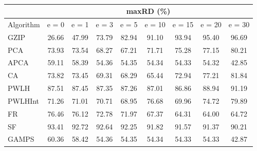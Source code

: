 \begin{table}[h]
\newcommand{\cpca}{\cellcolor{cyan!20}}
\newcommand{\capca}{\cellcolor{green!20}}
\newcommand{\cfr}{\cellcolor{yellow!25}}
\newcommand{\cgzip}{\cellcolor{orange!20}}
\newcommand{\best}{\cellcolor{gray!30}}
\centering\hspace*{0cm}\begin{tabular}{| l | c | c | c | c | c | c | c | c |}\cline{2-9}\multicolumn{1}{c|}{}& \multicolumn{8}{c|}{maxRD (\%)}\\\hline
{Algorithm} & {e = 0} & {e = 1} & {e = 3} & {e = 5} & {e = 10} & {e = 15} & {e = 20} & {e = 30} \\\hline
{GZIP\cgzip} & {\best26.66} & {\best47.99} & {73.79} & {82.94} & {91.10} & {93.94} & {95.40} & {96.69} \\\hline
{PCA\cpca} & {73.93} & {73.54} & {68.27} & {67.21} & {71.71} & {75.28} & {77.15} & {80.21} \\\hline
{APCA\capca} & {59.11} & {58.39} & {\best54.36} & {\best54.35} & {\best54.34} & {\best54.33} & {\best54.32} & {\best42.85} \\\hline
{CA} & {73.82} & {73.45} & {69.31} & {68.29} & {65.44} & {72.94} & {77.21} & {81.84} \\\hline
{PWLH} & {87.51} & {87.45} & {87.35} & {87.26} & {87.01} & {86.86} & {88.94} & {91.19} \\\hline
{PWLHInt} & {71.26} & {71.01} & {70.71} & {68.95} & {76.68} & {69.96} & {74.72} & {79.89} \\\hline
{FR\cfr} & {76.46} & {76.12} & {72.78} & {71.97} & {67.37} & {64.31} & {64.00} & {64.72} \\\hline
{SF} & {93.41} & {92.72} & {92.64} & {92.25} & {91.82} & {91.57} & {91.37} & {90.21} \\\hline
{GAMPS} & {60.36} & {58.42} & {54.36} & {54.35} & {54.34} & {54.33} & {54.33} & {42.87} \\\hline
\end{tabular}
\caption{\captionminmaxtwo}
\label{experiments:minmaxtwo}
\end{table}
